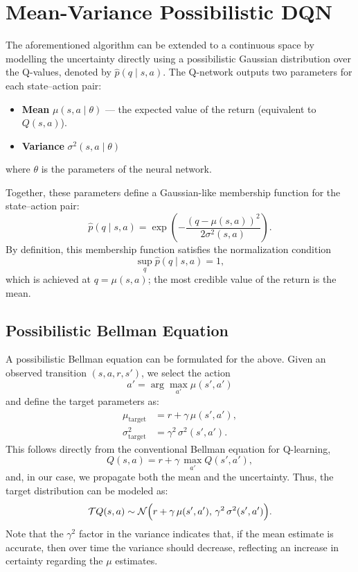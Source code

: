 \documentclass[11pt,a4paper]{report}
\begin{document}
\section{Mean-Variance Possibilistic DQN}

The aforementioned algorithm can be extended to a continuous space by modelling the uncertainty directly using a possibilistic Gaussian distribution over the Q-values, denoted by \(\hat{p}(q \mid s, a)\). The Q-network outputs two parameters for each state–action pair:
\begin{itemize}
  \item \textbf{Mean} \(\mu(s,a \mid \theta )\) --- the expected value of the return (equivalent to \(Q(s,a)\)).
  \item \textbf{Variance} \(\sigma^2(s,a \mid \theta )\) 
\end{itemize}
where $\theta$ is the parameters of the neural network. 

Together, these parameters define a Gaussian-like membership function for the state–action pair:
\[
  \hat{p}(q \mid s, a) = \exp\!\left(-\frac{(q-\mu(s,a))^2}{2\sigma^2(s,a)}\right).
\]
By definition, this membership function satisfies the normalization condition
\[
  \sup_q \hat{p}(q \mid s, a) = 1,
\]
which is achieved at \(q = \mu(s,a)\); the most credible value of the return is the mean.

\subsection{Possibilistic Bellman Equation}

A possibilistic Bellman equation can be formulated for the above. Given an observed transition \((s,a,r,s')\), we select the action 
\[
  a' = \arg\max_{a'} \mu(s', a')
\]
and define the target parameters as:
\begin{align*}
  \mu_{\text{target}} &= r + \gamma\,\mu(s', a'), \\
  \sigma^2_{\text{target}} &= \gamma^2\,\sigma^2(s', a').
\end{align*}
This follows directly from the conventional Bellman equation for Q-learning,
\[
  Q(s,a) = r + \gamma\,\max_{a'} Q(s', a'),
\]
and, in our case, we propagate both the mean and the uncertainty. Thus, the target distribution can be modeled as:
\[
  \mathcal{T}Q(s,a) \sim \mathcal{N}\Bigl(r + \gamma\,\mu(s', a'),\, \gamma^2\,\sigma^2(s', a')\Bigr).
\]
Note that the \(\gamma^2\) factor in the variance indicates that, if the mean estimate is accurate, then over time the variance should decrease, reflecting an increase in certainty regarding the \(\mu\) estimates. \par
\end{document}
